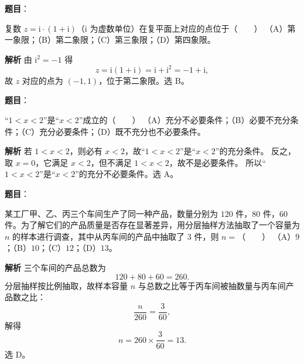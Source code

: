 
\begin{answer}

\textbf{题目}：

复数 $z=\mathrm i\cdot(1+\mathrm i)$（$\mathrm i$ 为虚数单位）在复平面上对应的点位于\mbox{（　　）}
（A）第一象限；（B）第二象限；（C）第三象限；（D）第四象限。

\textbf{解析}
由 $\mathrm i^2=-1$ 得
\nopagebreak[4]
\[z=\mathrm i(1+\mathrm i)=\mathrm i+\mathrm i^2=-1+\mathrm i,\]
故 $z$ 对应的点为 $(-1,1)$，位于第二象限。选 B。


\end{answer}
\begin{answer}

\textbf{题目}：

“$1<x<2$”是“$x<2$”成立的\mbox{（　　）}
（A）充分不必要条件；（B）必要不充分条件；（C）充分必要条件；（D）既不充分也不必要条件。

\textbf{解析}
若 $1<x<2$，则必有 $x<2$，故“$1<x<2$”是“$x<2$”的充分条件。
反之，取 $x=0$，它满足 $x<2$，但不满足 $1<x<2$，故不是必要条件。
所以“$1<x<2$”是“$x<2$”的充分不必要条件。选 A。


\end{answer}
\begin{answer}

\textbf{题目}：

某工厂甲、乙、丙三个车间生产了同一种产品，数量分别为 $120$ 件，$80$ 件，$60$ 件。为了解它们的产品质量是否存在显著差异，用分层抽样方法抽取了一个容量为 $n$ 的样本进行调查，其中从丙车间的产品中抽取了 $3$ 件，则 $n=$\mbox{（　　）}
（A）$9$；（B）$10$；（C）$12$；（D）$13$。

\textbf{解析}
三个车间的产品总数为
\nopagebreak[4]
\[120+80+60=260.\]
分层抽样按比例抽取，故样本容量 $n$ 与总数之比等于丙车间被抽数量与丙车间产品数之比：
\nopagebreak[4]
\[\frac{n}{260}=\frac3{60},\]
解得
\nopagebreak[4]
\[n=260\times\frac3{60}=13.\]
选 D。


\end{answer}
